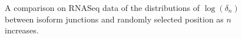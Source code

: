 \begin{figure}[hp!]
\begin{center}
        
    \end{center}
    \caption{A comparison on RNASeq data of the distributions of $\log(\delta_n)$ between isoform junctions and randomly selected position as $n$ increases.}
    \label{boxplots_rna}
\end{figure} 